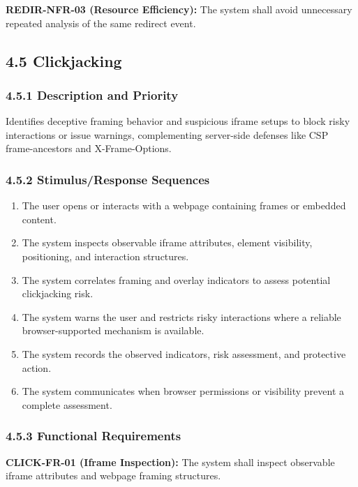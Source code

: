 \documentclass[12pt,a4paper]{report}
\let\originaladdcontentsline\addcontentsline
\renewcommand{\addcontentsline}[3]{\phantomsection\originaladdcontentsline{#1}{#2}{#3}}
\begin{document}
\textbf{REDIR-NFR-03 (Resource Efficiency):} The system shall avoid unnecessary repeated analysis of the same redirect event.\par

\subsection*{4.5 Clickjacking}

\subsubsection*{4.5.1 Description and Priority}

Identifies deceptive framing behavior and suspicious iframe setups to block risky interactions or issue warnings, complementing server-side defenses like CSP frame-ancestors and X-Frame-Options.\par

\subsubsection*{4.5.2 Stimulus/Response Sequences}

\begin{enumerate}
\item The user opens or interacts with a webpage containing frames or embedded content.
\item The system inspects observable iframe attributes, element visibility, positioning, and interaction structures.
\item The system correlates framing and overlay indicators to assess potential clickjacking risk.
\item The system warns the user and restricts risky interactions where a reliable browser-supported mechanism is available.
\item The system records the observed indicators, risk assessment, and protective action.
\item The system communicates when browser permissions or visibility prevent a complete assessment.
\end{enumerate}

\subsubsection*{4.5.3 Functional Requirements}

\textbf{CLICK-FR-01 (Iframe Inspection):} The system shall inspect observable iframe attributes and webpage framing structures.\par
\end{document}

